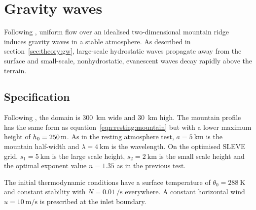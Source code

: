 \section{Gravity waves}
\label{sec:gw}

Following \textcite{schaer2002}, uniform flow over an idealised two-dimensional mountain ridge induces gravity waves in a stable atmosphere.  As described in section~\ref{sec:theory:gw}, large-scale hydrostatic waves propagate away from the surface and small-scale, nonhydrostatic, evanescent waves decay rapidly above the terrain.

\subsection{Specification}
Following \textcite{melvin2010}, the domain is \SI{300}{\kilo\meter} wide and \SI{30}{\kilo\meter} high.  The mountain profile has the same form as equation~\ref{eqn:resting:mountain} but with a lower maximum height of $h_0 = \SI{250}{\meter}$.  As in the resting atmosphere test, $a = \SI{5}{\kilo\meter}$ is the mountain half-width and $\lambda = \SI{4}{\kilo\meter}$ is the wavelength.  On the optimised SLEVE grid, $s_1 = \SI{5}{\kilo\meter}$ is the large scale height, $s_2 = \SI{2}{\kilo\meter}$ is the small scale height and the optimal exponent value $n = 1.35$ as in the previous test.

The initial thermodynamic conditions have a surface temperature of $\theta_0 = \SI{288}{\kelvin}$ and constant stability with $N = \SI{0.01}{\per\second}$ everywhere.  A constant horizontal wind $u = \SI{10}{\meter\per\second}$ is prescribed at the inlet boundary.

